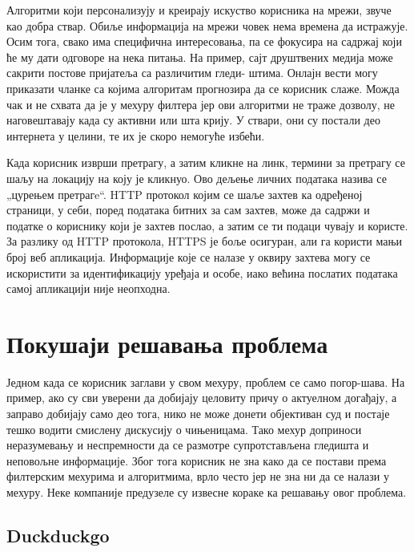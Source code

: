 \documentclass[a4paper]{article}
\begin{document}
Алгоритми који персонализују и креирају искуство корисника на мрежи, звуче као добра ствар. Обиље информација на мрежи човек нема времена да истражује. Осим тога, свако има специфична интересовања, па се фокусира на садржај који ће му дати одговоре на нека питања. На пример, сајт друштвених медија може сакрити постове пријатеља са различитим гледи-
штима. Онлајн вести могу приказати чланке са којима алгоритам прогнозира да се корисник слаже. Можда чак и не схвата да је у мехуру филтера јер ови алгоритми не траже дозволу, не наговештавају када су активни или шта крију. У ствари, они су постали део интернета у целини, те их је скоро немогуће избећи.

Када корисник изврши претрагу, а затим кликне на линк, термини за претрагу се шаљу на локацију на коју је кликнуо. Ово дељење личних података назива се „цурењем претрагe“. HTTP протокол којим се шаље захтев ка одређеној страници, у себи, поред података битних за сам захтев, може да садржи и податке о кориснику који је захтев послао, а затим се ти подаци чувају и користе. За разлику од HTTP протокола, HTTPS је боље осигуран, али га користи мањи број веб апликација. Информације које се налазе у оквиру захтева могу се искористити за идентификацију уређаја и особе, иако већина послатих података самој апликацији није неопходна.


\newpage
\section{Покушаји решавања проблема}
\label{sec:naslov3}

Једном када се корисник заглави у свом мехуру, проблем се само погор-шава. На пример, ако су сви уверени да добијају целовиту причу о актуелном догађају, а заправо добијају само део тога, нико не може донети објективан суд и постаје тешко водити смислену дискусију о чињеницама. Тако мехур доприноси неразумевању и неспремности да се размотре супротстављена гледишта и неповољне информације. Због тога корисник не зна како да се постави према филтерским мехурима и алгоритмима, врло често јер не зна ни да се налази у мехуру. Неке компаније предузеле су извесне кораке ка решавању овог проблема.

\subsection{Duckduckgo}
\label{podnaslov7}
\end{document}
